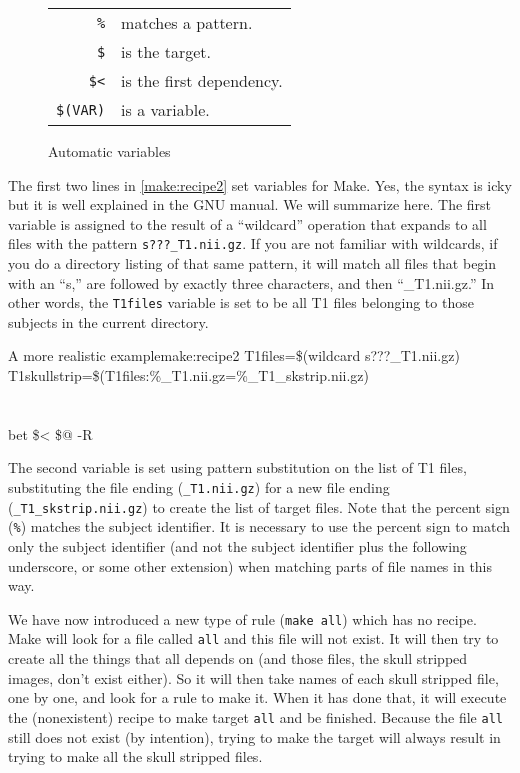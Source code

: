 \begin{figure}[h!]
	\begin{center}
		\begin{tabular}{ r l }
			\texttt{\%} 	& matches a pattern. \\
			\texttt{\$\@}	& is the target. \\
			\texttt{\$<}	& is the first dependency. \\
			\texttt{\$(VAR)}& is a \maken{} variable.
		\end{tabular}
	\end{center}	
	\caption{Automatic \maken{} variables}
\end{figure}

The first two lines in \autoref{make:recipe2} set variables for Make. Yes, the syntax is icky but it is well explained in the GNU \maken{} manual. We will summarize here. The first variable is assigned to the result of a ``wildcard'' operation that expands to all files with the pattern \texttt{s???_T1.nii.gz}. If you are not familiar with wildcards, if you do a directory listing of that same pattern, it will match all files that begin with an ``s,'' are followed by exactly three characters, and then ``_T1.nii.gz.'' In other words, the \texttt{T1files} variable is set to be all T1 files belonging to those subjects in the current directory.
	
\begin{make}{A more realistic example}{make:recipe2}
	T1files=\$(wildcard s???_T1.nii.gz) \\
	T1skullstrip=\$(T1files:\%_T1.nii.gz=\%_T1_skstrip.nii.gz) \\
	 \\
		
	\\
	\tab bet \$< \$@ -R
\end{make}
	
The second variable is set using pattern substitution on the list of T1 files, substituting the file ending (\texttt{_T1.nii.gz}) for a new file ending (\texttt{_T1_skstrip.nii.gz}) to create the list of target files. Note that the percent sign (\texttt{\%}) matches the subject identifier. It is necessary to use the percent sign to match only the subject identifier (and not the subject identifier plus the following underscore, or some other extension) when matching parts of file names in this way. 
	
We have now introduced a new type of rule (\texttt{make all}) which has no recipe. Make will look for a file called \texttt{all} and this file will not exist. It will then try to create all the things that all depends on (and those files, the skull stripped images, don't exist either). So it will then take names of each skull stripped file, one by one, and look for a rule to make it. When it has done that, it will execute the (nonexistent) recipe to make target \texttt{all} and be finished. Because the file \texttt{all} still does not exist (by intention), trying to make the target will always result in trying to make all the skull stripped files.
	
